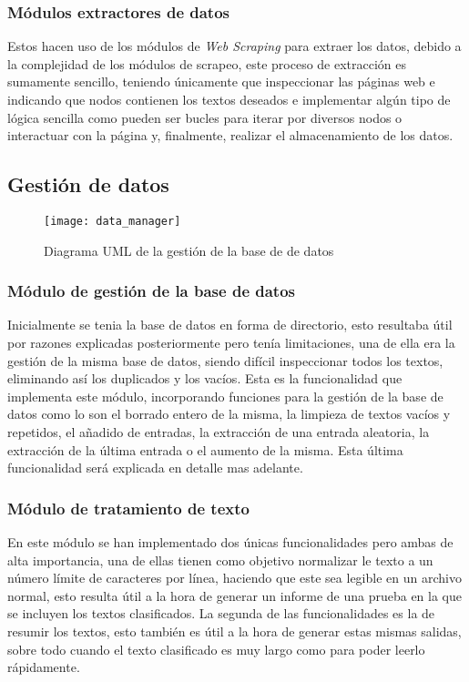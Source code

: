 \subsubsection{Módulos extractores de datos} Estos hacen uso de los módulos de
\textit{Web Scraping} para extraer los datos, debido a la complejidad de los módulos de
scrapeo, este proceso de extracción es sumamente sencillo, teniendo únicamente
que inspeccionar las páginas web e indicando que nodos contienen los textos
deseados e implementar algún tipo de lógica sencilla como pueden ser bucles para
iterar por diversos nodos o interactuar con la página y, finalmente, realizar el
almacenamiento de los datos. 

\subsection{Gestión de datos}

\begin{figure}[H]
    \centering
    \texttt{[image: data\_manager]}
    \captionsetup{justification=centering}
    \caption{Diagrama UML de la gestión de la base de de datos}
    \label{fig: Diagrama UML de la gestion de la base de de datos}
\end{figure}

\subsubsection{Módulo de gestión de la base de datos} Inicialmente se tenia la
base de datos en forma de directorio, esto resultaba útil por razones explicadas
posteriormente pero tenía limitaciones, una de ella era la gestión de la misma
base de datos, siendo difícil inspeccionar todos los textos, eliminando así los
duplicados y los vacíos. Esta es la funcionalidad que implementa este módulo,
incorporando funciones para la gestión de la base de datos como lo son el
borrado entero de la misma, la limpieza de textos vacíos y repetidos, el añadido
de entradas, la extracción de una entrada aleatoria, la extracción de la última
entrada o el aumento de la misma. Esta última funcionalidad será explicada en
detalle mas adelante.

\subsubsection{Módulo de tratamiento de texto} En este módulo se han implementado dos únicas
funcionalidades pero ambas de alta importancia, una de ellas tienen como
objetivo normalizar le texto a un número límite de caracteres por línea,
haciendo que este sea legible en un archivo normal, esto resulta útil a la hora
de generar un informe de una prueba en la que se incluyen los textos
clasificados. La segunda de las funcionalidades es la de resumir los textos,
esto también es útil a la hora de generar estas mismas salidas, sobre todo
cuando el texto clasificado es muy largo como para poder leerlo rápidamente.

